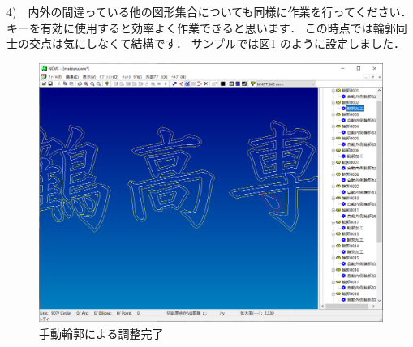 \newpage
4)　内外の間違っている他の図形集合についても同様に作業を行ってください．
キーを有効に使用すると効率よく作業できると思います．
この時点では輪郭同士の交点は気にしなくて結構です．
サンプルでは図\ref{fig:inout4.png} のように設定しました．

\begin{figure}[H]
\centering
\includegraphics[scale=0.5]{No3/fig/inout4.png}
\caption{手動輪郭による調整完了}
\label{fig:inout4.png}
\end{figure}
